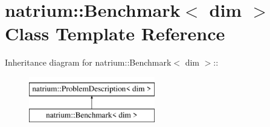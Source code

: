 \hypertarget{classnatrium_1_1Benchmark}{
\section{natrium::Benchmark$<$ dim $>$ Class Template Reference}
\label{classnatrium_1_1Benchmark}
}
Inheritance diagram for natrium::Benchmark$<$ dim $>$::\begin{figure}[H]
\begin{center}
\leavevmode
\includegraphics[height=2cm]{classnatrium_1_1Benchmark}
\end{center}
\end{figure}
